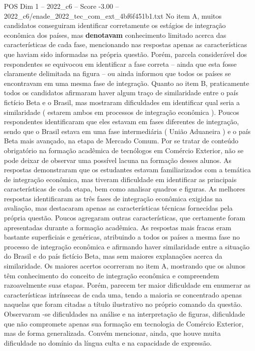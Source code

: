 \begin{textsample}{POS Dim 1 – 2022\_c6 – Score -3.00 – 2022\_c6/enade\_2022\_tec\_com\_ext\_4bf6f451b1.txt}
No item A, muitos candidatos conseguiram identificar corretamente os estágios de integração econômica dos países, mas \textbf{denotavam} conhecimento limitado acerca das características de cada fase, mencionando nas respostas apenas as características que haviam sido informadas na própria questão.
Porém, parcela considerável dos respondentes se equivocou em identificar a fase correta – ainda que esta fosse claramente delimitada na figura – ou ainda informou que todos os países se encontravam em uma mesma fase de integração.
Quanto ao item B, praticamente todos os candidatos afirmaram haver algum traço de similaridade entre o país fictício Beta e o Brasil, mas mostraram dificuldades em identificar qual seria a similaridade ( estarem ambos em processos de integração econômica ).
Poucos respondentes identificaram que eles estavam em fases diferentes de integração, sendo que o Brasil estava em uma fase intermediária ( União Aduaneira ) e o país Beta mais avançado, na etapa de Mercado Comum.
Por se tratar de conteúdo obrigatório na formação acadêmica de tecnólogos em Comércio Exterior, não se pode deixar de observar uma possível lacuna na formação desses alunos.
As respostas demonstraram que os estudantes estavam familiarizados com a temática de integração econômica, mas tiveram dificuldade em identificar as principais características de cada etapa, bem como analisar quadros e figuras.
As melhores respostas identificaram as três fases de integração econômica exigidas na avaliação, mas destacaram apenas as características técnicas fornecidas pela própria questão.
Poucos agregaram outras características, que certamente foram apresentadas durante a formação acadêmica.
As respostas mais fracas eram bastante superficiais e genéricas, atribuindo a todos os países a mesma fase no processo de integração econômica e afirmando haver similaridade entre a situação do Brasil e do país fictício Beta, mas sem maiores explanações acerca da similaridade.
Os maiores acertos ocorreram no item A, mostrando que os alunos têm conhecimento do conceito de integração econômica e compreendem razoavelmente suas etapas.
Porém, parecem ter maior dificuldade em enumerar as características intrínsecas de cada uma, tendo a maioria se concentrado apenas naquelas que foram citadas a título ilustrativo no próprio comando da questão.
Observaram -se dificuldades na análise e na interpretação de figuras, dificuldade que não compromete apenas sua formação em tecnologia de Comércio Exterior, mas de forma generalizada.
Convém mencionar, ainda, que houve muita dificuldade no domínio da língua culta e na capacidade de expressão.

\end{textsample}
